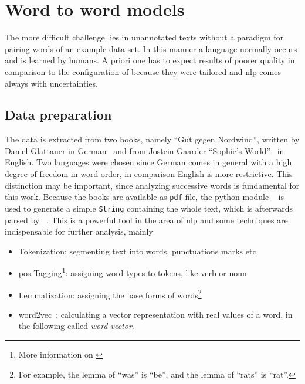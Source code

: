 \section{Word to word models} \label{sec: w2w models}
The more difficult challenge lies in unannotated texts without a paradigm for pairing words of an example data set. In this manner a language normally occurs and is learned by humans. A priori one has to expect results of poorer quality in comparison to the configuration of  because they were tailored and \gls{nlp} comes always with uncertainties.


\subsection{Data preparation} \label{sec: data preparation}
The data is extracted from two books, namely ``Gut gegen Nordwind'', written by Daniel Glattauer in German~\cite{Glattauer06GGW} and from Jostein Gaarder ``Sophie's World''~\cite{Gaarder96SW} in English. Two languages were chosen since German comes in general with a high degree of freedom in word order, in comparison English is more restrictive. This distinction may be important, since analyzing successive words is fundamental for this work. Because the books are available as \texttt{pdf}-file, the python module \pymupdf{}~\cite{pymupdf} is used to generate a simple \texttt{String} containing the whole text, which is afterwards parsed by \spacy{}~\cite{spacy2}. This is a powerful tool in the area of \gls{nlp} and some techniques are indispensable for further analysis, mainly
\begin{itemize}
	\item Tokenization: segmenting text into words, punctuations marks etc.
	\item \gls{pos}-Tagging\footnote{More information on \cite{udpostags}}: assigning word types to tokens, like verb or noun \label{item: pos tag}
	\item Lemmatization: assigning the base forms of words\footnote{For example, the lemma of “was” is “be”, and the lemma of “rats” is “rat”.}
	\item word2vec~\cite{MikolovEtAl13DRW, MikolovEtAl13EEW}: calculating a vector representation with real values of a word, in the following called \emph{word vector}.
\end{itemize}
